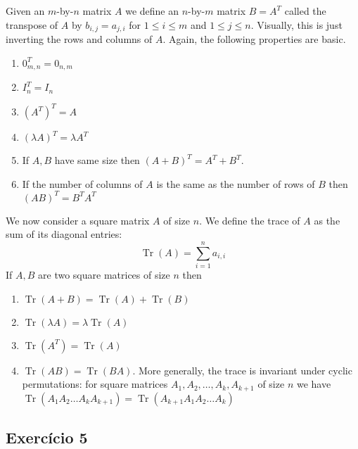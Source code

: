 Given an $m$-by-$n$ matrix $A$ we define an $n$-by-$m$ matrix $B = A^T$
called the transpose of $A$ by $b_{i,j} = a_{j,i}$ for $1 \leq i \leq m$
and $1 \leq j \leq n$. Visually, this is just inverting the rows and
columns of $A$.
Again, the following properties are basic.
\begin{enumerate}
\item $0_{m,n}^T = 0_{n,m}$
\item $I_n^T = I_n$
\item ${(A^T)}^T = A$
\item ${(\lambda A)}^T = \lambda A^T$
\item If $A,B$ have same size then ${(A+B)}^T = A^T + B^T$.
\item If the number of columns of $A$  is the same as the number of rows
  of $B$ then ${(A B)}^T = B^T A^T$
\end{enumerate}

We now consider a square matrix $A$ of size $n$. We define the
trace of $A$ as the sum of its diagonal entries:
$$
\operatorname{Tr}(A) = \sum_{i=1}^n a_{i,i}
$$
If $A,B$ are two square matrices of size $n$ then
\begin{enumerate}
\item $\operatorname{Tr}(A+B) = \operatorname{Tr}(A)+\operatorname{Tr}(B)$
\item $\operatorname{Tr}(\lambda A) = \lambda \operatorname{Tr}(A)$
\item $\operatorname{Tr}(A^T) = \operatorname{Tr}(A)$
\item  $\operatorname{Tr}(A B) = \operatorname{Tr}(B A)$.
  More generally,
  the trace is invariant under cyclic permutations:
  for square matrices $A_1,A_2,\dots,A_k,A_{k+1}$
  of size $n$ we have  $\operatorname{Tr}(A_1 A_2 \dots A_k A_{k+1}) =
  \operatorname{Tr}(A_{k+1} A_1 A_2 \dots A_k )$
\end{enumerate}

\subsection*{Exercício 5}

